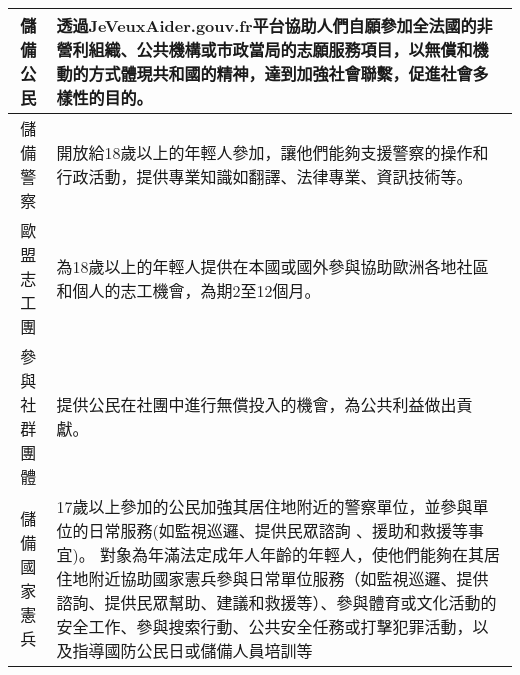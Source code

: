 \documentclass[a4paper,14pt]{extarticle}
\theoremstyle{plain}
\theoremstyle{remark}
\numberwithin{equation}{section}
\begin{document}
\begin{center}
\begin{tabularx}{\textwidth}{ | c | X |}
	\\ \hline
  儲備公民 %
        & 
  透過JeVeuxAider.gouv.fr平台協助人們自願參加全法國的非營利組織、公共機構或市政當局的志願服務項目，以無償和機動的方式體現共和國的精神，達到加強社會聯繫，促進社會多樣性的目的。
	\\ \hline 
	儲備警察
			   &
         開放給18歲以上的年輕人參加，讓他們能夠支援警察的操作和行政活動，提供專業知識如翻譯、法律專業、資訊技術等。
	\\ \hline 
	歐盟志工團 %
			   & 為18歲以上的年輕人提供在本國或國外參與協助歐洲各地社區和個人的志工機會，為期2至12個月。

	\\ \hline 
	參與社群團體 %
			   & 提供公民在社團中進行無償投入的機會，為公共利益做出貢獻。
	\\ \hline 
	儲備國家憲兵 %
		&
    17歲以上參加的公民加強其居住地附近的警察單位，並參與單位的日常服務(如監視巡邏、提供民眾諮詢 、援助和救援等事宜)。
    對象為年滿法定成年人年齡的年輕人，使他們能夠在其居住地附近協助國家憲兵參與日常單位服務（如監視巡邏、提供諮詢、提供民眾幫助、建議和救援等）、參與體育或文化活動的安全工作、參與搜索行動、公共安全任務或打擊犯罪活動，以及指導國防公民日或儲備人員培訓等
	\\ \hline 
\end{tabularx}
\end{center}
\end{document}
